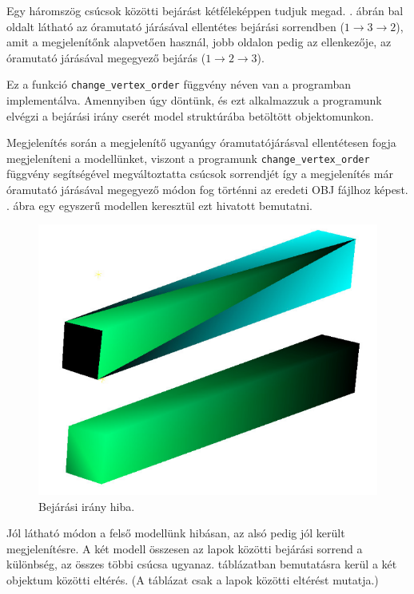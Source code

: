 Egy háromszög csúcsok közötti bejárást kétféleképpen tudjuk megad. . ábrán bal oldalt látható az óramutató járásával ellentétes bejárási sorrendben ($1 \rightarrow 3 \rightarrow 2$), amit a megjelenítőnk alapvetően használ, jobb oldalon pedig az ellenkezője, az óramutató járásával megegyező bejárás ($1 \rightarrow 2 \rightarrow 3$).

Ez a funkció \texttt{change\_vertex\_order} függvény néven van a programban implementálva. Amennyiben úgy döntünk, és ezt alkalmazzuk a programunk elvégzi a bejárási irány cserét model struktúrába betöltött objektomunkon.

Megjelenítés során a megjelenítő ugyanúgy óramutatójárásval ellentétesen fogja megjeleníteni a modellünket, viszont a programunk \texttt{change\_vertex\_order} függvény segítségével megváltoztatta csúcsok sorrendjét így a megjelenítés már óramutató járásával megegyező módon fog történni az eredeti OBJ fájlhoz képest.
\newpage
{}. ábra egy egyszerű modellen keresztül ezt hivatott bemutatni.

\begin{figure}[h]
\centering
\includegraphics[scale=0.5]{images/order.png}
\caption{Bejárási irány hiba.}
\label{fig:bej2}
\end{figure}

Jól látható módon a felső modellünk hibásan, az alsó pedig jól került megjelenítésre. A két modell összesen az lapok közötti bejárási sorrend a különbség, az összes többi csúcsa ugyanaz.  táblázatban bemutatásra kerül a két objektum közötti eltérés. (A táblázat csak a lapok közötti eltérést mutatja.)

